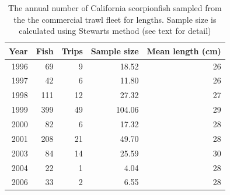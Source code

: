 \documentclass[12pt,]{article}
\begin{document}
\begin{table}[ht]
\centering
\caption{The annual number of California scorpionfish 
                                              sampled from the the commercial trawl 
                                            fleet for lengths. Sample size is calculated 
                                            using Stewarts method (see text for detail)} 
\label{tab:ComTrawl_lengthsample}
\begin{tabular}{rrrrr}
  \hline
Year & Fish & Trips & Sample size & Mean length (cm) \\ 
  \hline
1996 & 69 & 9 & 18.52 & 26 \\ 
  1997 & 42 & 6 & 11.80 & 26 \\ 
  1998 & 111 & 12 & 27.32 & 27 \\ 
  1999 & 399 & 49 & 104.06 & 29 \\ 
  2000 & 82 & 6 & 17.32 & 28 \\ 
  2001 & 208 & 21 & 49.70 & 28 \\ 
  2003 & 84 & 14 & 25.59 & 30 \\ 
  2004 & 22 & 1 & 4.04 & 28 \\ 
  2006 & 33 & 2 & 6.55 & 28 \\ 
   \hline
\end{tabular}
\end{table}

\FloatBarrier
\newpage

\vspace{2in}
\end{document}
